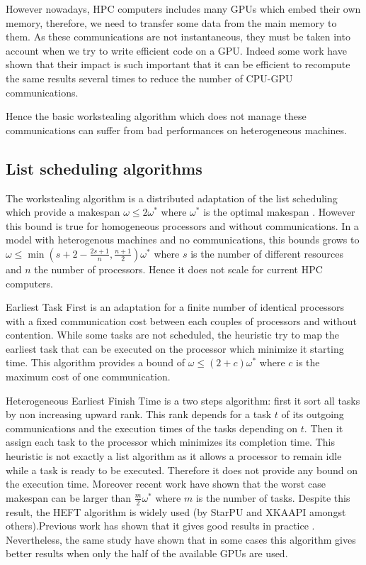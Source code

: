 \documentclass[10pt, conference, compsocconf,pdftex,dvipsnames]{IEEEtran}
\begin{document}
However nowadays, HPC computers includes many GPUs which embed their own
memory, therefore, we need to transfer some data from the main memory
to them. As these communications are not instantaneous, they must be taken
into account when we try to write efficient code on a GPU.  Indeed some work
\cite{venkatasubramanian2009tuned} have shown that their impact is such
important that it can be efficient to recompute the same results several
times to reduce the number of CPU-GPU communications.  

Hence the basic workstealing algorithm which does not manage these
communications can suffer from bad performances on heterogeneous machines. 

\subsection{List scheduling algorithms}

The workstealing algorithm is a distributed adaptation of the list scheduling
which provide a makespan $\omega\leq2\omega^*$ where $\omega^*$ is the optimal
makespan \cite{GrahamRL1966Bounds, GrahamRL1969Bounds}. However this bound is
true for homogeneous processors and without communications. In a model with
heterogenous machines and no communications, this bounds grows to
$\omega\leq\min(s+2-\frac{2s+1}{n},\frac{n+1}{2})\omega^*$ where $s$ is the
number of different resources and $n$ the number of processors. Hence it
does not scale for current HPC computers. 

Earliest Task First\cite{hwang1989scheduling} is an adaptation for a finite
number of identical processors with a fixed communication cost between each
couples of processors and without contention. While some tasks are not
scheduled, the heuristic try to map the earliest task that can be executed on
the processor which minimize it starting time. This algorithm provides a bound
of $\omega\leq(2+c)\omega^*$ where $c$ is the maximum cost of one
communication.  

Heterogeneous Earliest Finish Time \cite{topcuoglu2002performance}  is a two
steps algorithm: first it sort all tasks by non increasing upward rank. This
rank depends for a task $t$ of its outgoing communications and the execution
times of the tasks depending on $t$. Then it assign each task to the processor
which minimizes its completion time. This heuristic is not exactly a list
algorithm as it allows a processor to remain idle while a task is ready to be
executed.  Therefore it does not provide any bound on the execution time.
Moreover recent work \cite{Kedad-SidhoumMonnaMounieEtAl2013} have shown that
the worst case makespan can be larger than $\frac{m}{2}\omega^*$ where $m$ is
the number of tasks. Despite this result, the HEFT algorithm is widely used
(by StarPU and XKAAPI amongst others).Previous work has shown that it gives
good results in practice \cite{ferreiralima:hal-00735470}. Nevertheless, the
same study have shown that in some cases this algorithm gives better results
when only the half of the available GPUs are used.
\end{document}

